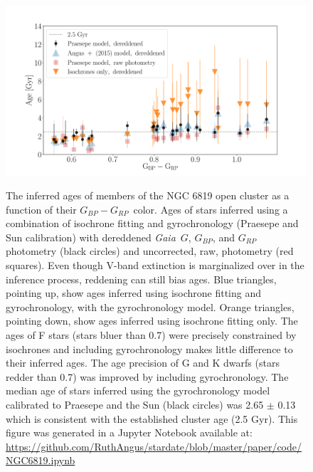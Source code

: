\documentclass[useAMS, usenatbib, preprint, 12pt]{aastex}
\newcommand{\gaia}{{\it Gaia}}
\newcommand{\gcolor}{$G_{BP} - G_{RP}$}
\begin{document}
\begin{figure}
  \caption{
    The inferred ages of members of the NGC 6819 open cluster as a function of
    their \gcolor\ color.
    Ages of stars inferred using a combination of isochrone fitting and
    gyrochronology (Praesepe and Sun calibration) with dereddened \gaia\ $G$,
    $G_{BP}$, and $G_{RP}$ photometry (black circles) and uncorrected, raw,
    photometry (red squares).
    Even though V-band extinction is marginalized over in the inference
    process, reddening can still bias ages.
    Blue triangles, pointing up, show ages inferred using isochrone fitting
    and gyrochronology, with the \citet{angus2015} gyrochronology model.
    Orange triangles, pointing down, show ages inferred using isochrone
    fitting only.
    The ages of F stars (stars bluer than 0.7) were precisely constrained by
    isochrones and including gyrochronology makes little difference to their
    inferred ages.
    The age precision of G and K dwarfs (stars redder than 0.7) was improved
    by including gyrochronology.
    The median age of stars inferred using the gyrochronology model
    calibrated to Praesepe and the Sun (black circles) was 2.65 $\pm$ 0.13
    which is consistent with the established cluster age (2.5 Gyr).
    This figure was generated in a Jupyter Notebook available at:
    \url{https://github.com/RuthAngus/stardate/blob/master/paper/code/NGC6819.ipynb}
}
  \centering
    \includegraphics[width=1\textwidth]{NGC6819_results}
\label{fig:NGC6819_results}
\end{figure}
\end{document}
